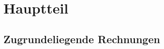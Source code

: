 \chapter{Hauptteil}
\label{cha:Hauptteil}

\section{Zugrundeliegende Rechnungen}
\label{sec:zugrundeliegende}










